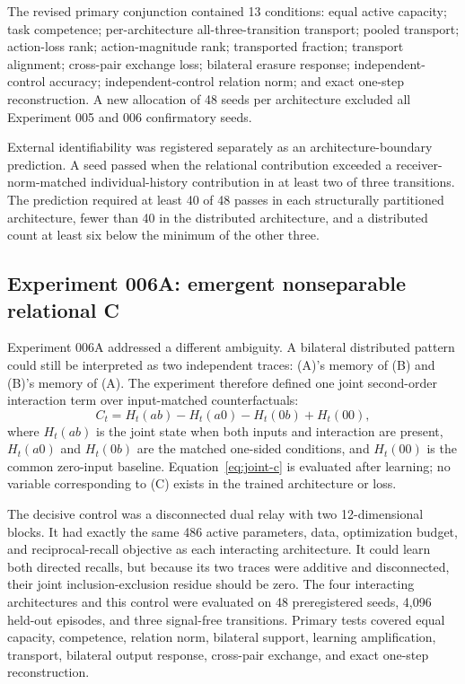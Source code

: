 \documentclass[11pt,a4paper]{article}
\begin{document}
The revised primary conjunction contained 13 conditions: equal active capacity; task competence; per-architecture all-three-transition transport; pooled transport; action-loss rank; action-magnitude rank; transported fraction; transport alignment; cross-pair exchange loss; bilateral erasure response; independent-control accuracy; independent-control relation norm; and exact one-step reconstruction. A new allocation of 48 seeds per architecture excluded all Experiment 005 and 006 confirmatory seeds.

External identifiability was registered separately as an architecture-boundary prediction. A seed passed when the relational contribution exceeded a receiver-norm-matched individual-history contribution in at least two of three transitions. The prediction required at least 40 of 48 passes in each structurally partitioned architecture, fewer than 40 in the distributed architecture, and a distributed count at least six below the minimum of the other three.

\subsection{Experiment 006A: emergent nonseparable relational C}

Experiment 006A addressed a different ambiguity. A bilateral distributed pattern could still be interpreted as two independent traces: (A)'s memory of (B) and (B)'s memory of (A). The experiment therefore defined one joint second-order interaction term over input-matched counterfactuals:
\begin{equation}
 C_t = H_t(ab)-H_t(a0)-H_t(0b)+H_t(00),
 \label{eq:joint-c}
\end{equation}
where $H_t(ab)$ is the joint state when both inputs and interaction are present, $H_t(a0)$ and $H_t(0b)$ are the matched one-sided conditions, and $H_t(00)$ is the common zero-input baseline. Equation~\eqref{eq:joint-c} is evaluated after learning; no variable corresponding to (C) exists in the trained architecture or loss.

The decisive control was a disconnected dual relay with two 12-dimensional blocks. It had exactly the same 486 active parameters, data, optimization budget, and reciprocal-recall objective as each interacting architecture. It could learn both directed recalls, but because its two traces were additive and disconnected, their joint inclusion-exclusion residue should be zero. The four interacting architectures and this control were evaluated on 48 preregistered seeds, 4,096 held-out episodes, and three signal-free transitions. Primary tests covered equal capacity, competence, relation norm, bilateral support, learning amplification, transport, bilateral output response, cross-pair exchange, and exact one-step reconstruction.
\end{document}
